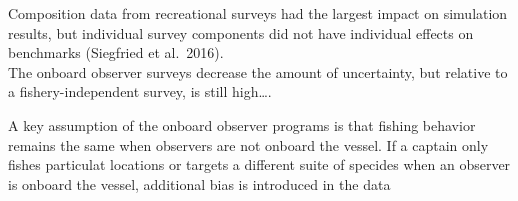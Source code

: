 \documentclass[preprint, 3p,
authoryear]{elsarticle} %
\begin{document}
Composition data from recreational surveys had the largest impact on
simulation results, but individual survey components did not have
individual effects on benchmarks (Siegfried et al.~2016).\\
The onboard observer surveys decrease the amount of uncertainty, but
relative to a fishery-independent survey, is still high\ldots.

A key assumption of the onboard observer programs is that fishing
behavior remains the same when observers are not onboard the vessel. If
a captain only fishes particulat locations or targets a different suite
of specides when an observer is onboard the vessel, additional bias is
introduced in the data

\renewcommand\refname{References}

\end{document}
